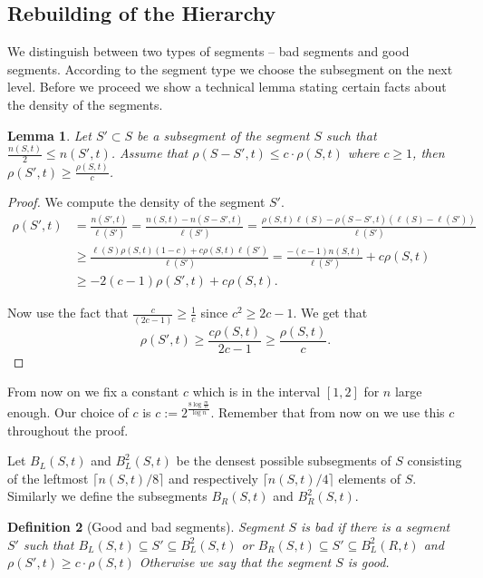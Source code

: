 \documentclass[11pt]{article} %
\newcommand{\density}[2]{\rho(#1, #2)}
\newcommand{\length}[1]{\ell(#1)}
\newcommand{\scount}[2]{n(#1, #2)}
\newtheorem{definition}{Definition} %
\newtheorem{lemma}[definition]{Lemma}
\begin{document}
\subsection{Rebuilding of the Hierarchy}
We distinguish between two types of segments -- bad segments and good segments.
According to the segment type we choose the subsegment on the next level.
Before we proceed we show a technical lemma stating certain facts about the density of the segments.

\begin{lemma}
\label{lm:density-estimate}
Let $S' \subset S$ be a subsegment of the segment $S$ such that $\frac{n(S, t)}{2} \leq n(S', t)$. 
Assume that $\density{S - S'}{t} \leq c \cdot \density{S}{t}$ where $c \geq 1$, then $\density{S'}{t} \geq \frac{\density{S}{t}}{c}$.
\end{lemma}
\begin{proof}
We compute the density of the segment $S'$.
\[
\begin{split}
\density{S'}{t}
	& = \frac{\scount{S'}{t}}{\length{S'}} = \frac{\scount{S}{t} - \scount{S - S'}{t}}{\length{S'}} = \frac{\density{S}{t}\length{S} - \density{S-S'}{t}(\length{S} - \length{S'})}{\length{S'}} \\
	& \geq \frac{\length{S}\density{S}{t}(1 - c) + c\density{S}{t}\length{S'}}{\length{S'}} = \frac{-(c - 1)\scount{S}{t}}{\length{S'}} + c\density{S}{t} \\
	& \geq -2(c - 1)\density{S'}{t} + c\density{S}{t}.
\end{split}
\]

Now use the fact that $\frac{c}{(2c - 1)} \geq \frac{1}{c}$ since $c^2 \geq 2c -1$.
We get that
\[
\density{S'}{t} \geq \frac{c\density{S}{t}}{2c - 1} \geq \frac{\density{S}{t}}{c}.
\]
\end{proof}

From now on we fix a constant $c$ which is in the interval $[1, 2]$ for $n$ large enough.
Our choice of $c$ is $c := 2^{\frac{8\log \frac{m}{n}}{\log n}}$.
Remember that from now on we use this $c$ throughout the proof. 

Let $B_L(S, t)$ and $B^2_L(S, t)$ be the densest possible subsegments of $S$ consisting of the leftmost $\lceil\scount{S}{t}/8\rceil$ and respectively $\lceil\scount{S}{t}/4\rceil$ elements of $S$. Similarly we define the subsegments $B_R(S, t)$ and $B^2_R(S, t)$.

\begin{definition}[Good and bad segments]
Segment $S$ is \emph{bad} if there is a segment $S'$ such that $B_L(S, t) \subseteq S' \subseteq B^2_L(S, t)$ or $B_R(S, t) \subseteq S' \subseteq B^2_L(R, t)$ and $\density{S'}{t} \geq c \cdot \density{S}{t}$
Otherwise we say that the segment $S$ is \emph{good}.
\end{definition}
\end{document}
